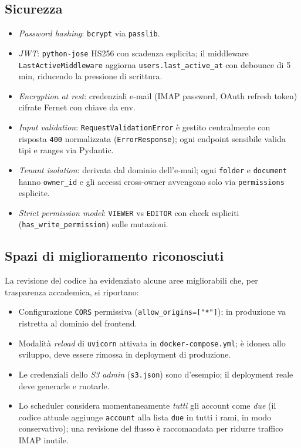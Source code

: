\documentclass[11pt,a4paper,oneside]{article}
\begin{document}
\subsection{Sicurezza}
\begin{itemize}[leftmargin=*]
    \item \emph{Password hashing}: \texttt{bcrypt} via \texttt{passlib}.
    \item \emph{JWT}: \texttt{python-jose} \textsc{HS256} con scadenza esplicita;
          il middleware \texttt{LastActiveMiddleware} aggiorna
          \texttt{users.last\_active\_at} con debounce di 5\,min,
          riducendo la pressione di scrittura.
    \item \emph{Encryption at rest}: credenziali e-mail (IMAP password,
          OAuth refresh token) cifrate Fernet con chiave da env.
    \item \emph{Input validation}: \texttt{RequestValidationError} \`e gestito
          centralmente con risposta \texttt{400} normalizzata
          (\texttt{ErrorResponse}); ogni endpoint sensibile valida tipi e
          ranges via Pydantic.
    \item \emph{Tenant isolation}: derivata dal dominio dell'e-mail; ogni
          \texttt{folder} e \texttt{document} hanno \texttt{owner\_id} e gli
          accessi cross-owner avvengono solo via \texttt{permissions}
          esplicite.
    \item \emph{Strict permission model}: \texttt{VIEWER} vs \texttt{EDITOR}
          con check espliciti (\texttt{has\_write\_permission}) sulle mutazioni.
\end{itemize}

\subsection{Spazi di miglioramento riconosciuti}
La revisione del codice ha evidenziato alcune aree migliorabili che, per
trasparenza accademica, si riportano:
\begin{itemize}[leftmargin=*]
    \item Configurazione \texttt{CORS} permissiva (\texttt{allow\_origins=["*"]});
          in produzione va ristretta al dominio del frontend.
    \item Modalit\`a \emph{reload} di \texttt{uvicorn} attivata in
          \texttt{docker-compose.yml}; \`e idonea allo sviluppo, deve essere
          rimossa in deployment di produzione.
    \item Le credenziali dello \emph{S3 admin} (\texttt{s3.json}) sono
          d'esempio; il deployment reale deve generarle e ruotarle.
    \item Lo scheduler considera momentaneamente \emph{tutti} gli account
          come \emph{due} (il codice attuale aggiunge \texttt{account} alla lista
          \texttt{due} in tutti i rami, in modo conservativo); una revisione
          del flusso \`e raccomandata per ridurre traffico IMAP inutile.
\end{itemize}
\end{document}

